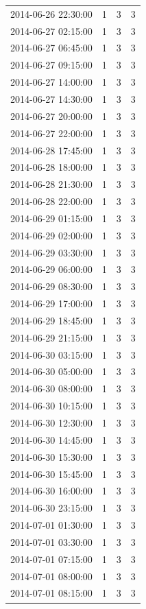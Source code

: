 \begin{tabular}{lrrr}
2014-06-26 22:30:00 & 1 & 3 & 3 \\
2014-06-27 02:15:00 & 1 & 3 & 3 \\
2014-06-27 06:45:00 & 1 & 3 & 3 \\
2014-06-27 09:15:00 & 1 & 3 & 3 \\
2014-06-27 14:00:00 & 1 & 3 & 3 \\
2014-06-27 14:30:00 & 1 & 3 & 3 \\
2014-06-27 20:00:00 & 1 & 3 & 3 \\
2014-06-27 22:00:00 & 1 & 3 & 3 \\
2014-06-28 17:45:00 & 1 & 3 & 3 \\
2014-06-28 18:00:00 & 1 & 3 & 3 \\
2014-06-28 21:30:00 & 1 & 3 & 3 \\
2014-06-28 22:00:00 & 1 & 3 & 3 \\
2014-06-29 01:15:00 & 1 & 3 & 3 \\
2014-06-29 02:00:00 & 1 & 3 & 3 \\
2014-06-29 03:30:00 & 1 & 3 & 3 \\
2014-06-29 06:00:00 & 1 & 3 & 3 \\
2014-06-29 08:30:00 & 1 & 3 & 3 \\
2014-06-29 17:00:00 & 1 & 3 & 3 \\
2014-06-29 18:45:00 & 1 & 3 & 3 \\
2014-06-29 21:15:00 & 1 & 3 & 3 \\
2014-06-30 03:15:00 & 1 & 3 & 3 \\
2014-06-30 05:00:00 & 1 & 3 & 3 \\
2014-06-30 08:00:00 & 1 & 3 & 3 \\
2014-06-30 10:15:00 & 1 & 3 & 3 \\
2014-06-30 12:30:00 & 1 & 3 & 3 \\
2014-06-30 14:45:00 & 1 & 3 & 3 \\
2014-06-30 15:30:00 & 1 & 3 & 3 \\
2014-06-30 15:45:00 & 1 & 3 & 3 \\
2014-06-30 16:00:00 & 1 & 3 & 3 \\
2014-06-30 23:15:00 & 1 & 3 & 3 \\
2014-07-01 01:30:00 & 1 & 3 & 3 \\
2014-07-01 03:30:00 & 1 & 3 & 3 \\
2014-07-01 07:15:00 & 1 & 3 & 3 \\
2014-07-01 08:00:00 & 1 & 3 & 3 \\
2014-07-01 08:15:00 & 1 & 3 & 3 \\

\end{tabular}
